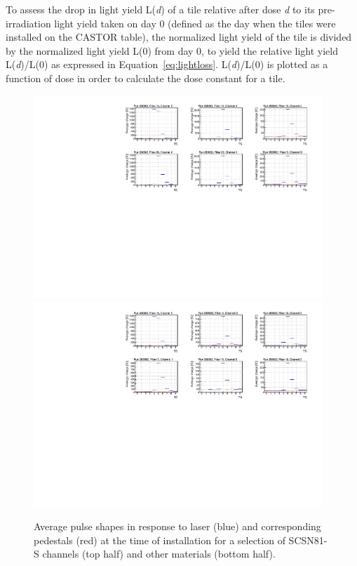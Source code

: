 To assess the drop in light yield L(\textit{d}) of a tile relative after dose \textit{d} to its pre-irradiation light yield taken on day 0 (defined as the day when the tiles were installed on the CASTOR table), the normalized light yield of the tile is divided by the normalized light yield L(0) from day 0, to yield the relative light yield L(\textit{d})/L(0) as expressed in Equation~\ref{eq:lightloss}. L(\textit{d})/L(0) is plotted as a function of dose in order to calculate the dose constant for a tile.

\begin{figure}[tbp!]
\centering
\includegraphics[width=0.97\textwidth]{figures/analysis/Pulse_shape_run280662_bright_SCSN81S.pdf}
\includegraphics[width=0.97\textwidth]{figures/analysis/Pulse_shape_run280662_bright_others.pdf}
\caption{Average pulse shapes in response to laser (blue) and corresponding pedestals (red) at the time of installation for a selection of SCSN81-S channels (top half) and other materials (bottom half).}
\label{pulse0ifb}
\end{figure} 

